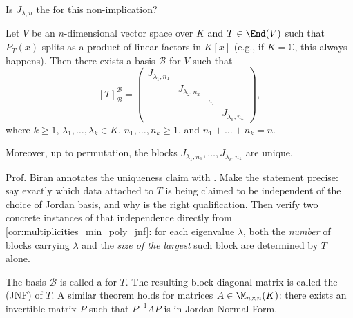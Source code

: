 \begin{question}
Is $J_{\lambda, n}$ the  for this non-implication?
\end{question}

\begin{theorem}
\label{thm:jordan_normal_form}
Let $V$ be an $n$-dimensional vector space over $K$ and $T \in \End(V)$ such that $P_T(x)$ splits as a product of linear factors in $K[x]$ (e.g., if $K = \mathbb{C}$, this always happens). Then there exists a basis $\mathcal{B}$ for $V$ such that
\[
[T]_{\mathcal{B}}^{\mathcal{B}} = \begin{pmatrix} J_{\lambda_1, n_1} & & & \\ & J_{\lambda_2, n_2} & & \\ & & \ddots & \\ & & & J_{\lambda_k, n_k} \end{pmatrix},
\]
where $k \ge 1$, $\lambda_1, \dots, \lambda_k \in K$, $n_1, \dots, n_k \ge 1$, and $n_1 + \dots + n_k = n$.

Moreover, up to permutation, the blocks $J_{\lambda_1, n_1}, \dots, J_{\lambda_k, n_k}$ are unique.
\end{theorem}

\begin{exercise}
\label{exc:jnf_uniqueness_meaning}
Prof. Biran annotates the uniqueness claim with . Make the statement precise: say exactly which data attached to $T$ is being claimed to be independent of the choice of Jordan basis, and why  is the right qualification. Then verify two concrete instances of that independence directly from \cref{cor:multiplicities_min_poly_jnf}: for each eigenvalue $\lambda$, both the \emph{number} of blocks carrying $\lambda$ and the \emph{size of the largest} such block are determined by $T$ alone.
\end{exercise}

\begin{remark}
\label{rem:jordan_basis}
The basis $\mathcal{B}$ is called a  for $T$. The resulting block diagonal matrix is called the  (JNF) of $T$. A similar theorem holds for matrices $A \in \M_{n \times n}(K)$: there exists an invertible matrix $P$ such that $P^{-1} A P$ is in Jordan Normal Form.
\end{remark}

